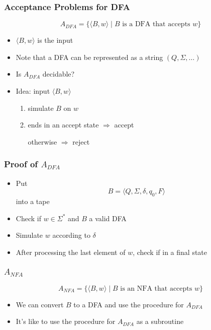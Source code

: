 \begin{frame}[allowframebreaks] \frametitle{Acceptance Problems for DFA}
\begin{equation*}
  A_{DFA}=
\{\langle  B,w\rangle\mid B \mbox{ is a DFA that accepts } w\}
\end{equation*}
  \begin{itemize}
\item $\langle  B,w\rangle$ is the input
\item [] Note that a DFA can be represented as a string $(Q, \Sigma, \ldots)$
\item Is $A_{DFA}$ decidable?

\item Idea: input $\langle  B,w\rangle$
  \begin{enumerate}
  \item simulate $B$ on $w$
  \item ends in an accept state $\Rightarrow$ accept

otherwise $\Rightarrow$ reject

  \end{enumerate}
\end{itemize}\end{frame} \begin{frame}[allowframebreaks] \frametitle{Proof of $A_{DFA}$}
  \begin{itemize}
  \item Put
    \begin{equation*}
    B=\langle  Q,\Sigma,\delta,q_0,F\rangle
  \end{equation*}
into a tape
\item Check if $w\in \Sigma^*$ and $B$ a valid DFA
\item Simulate $w$ according to $\delta$
\item After processing the last element of $w$, check if in a final state

\end{itemize}\end{frame} \begin{frame}[allowframebreaks] \frametitle{$A_{NFA}$}
\begin{equation*}
  A_{NFA}
=\{\langle  B,w\rangle \mid B \mbox{ is an NFA that accepts } w\}
\end{equation*}
  \begin{itemize}
\item We can convert $B$ to a DFA and 
use the procedure for $A_{DFA}$
\item It's like to use the procedure for $A_{DFA}$
as a subroutine


\end{itemize}
\end{frame}
